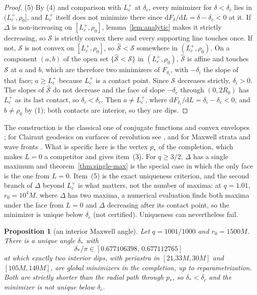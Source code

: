 \documentclass[aip,jmp,amsmath,amssymb,reprint]{revtex4-2}
\newcommand{\dd}{\mathrm{d}}
\theoremstyle{plain}
\newtheorem{proposition}{Proposition}[section]
\theoremstyle{definition}
\begin{document}
\begin{proof}
(5) By (4) and comparison with $L_c^+$ at $\delta_c$, every minimizer for $\delta<\delta_c$ lies in
$(L_c^+,\rho_0]$, and $L_c^+$ itself does not minimize there since $\dd F_\delta/\dd L=\delta-\delta_c<0$
at it. If $\Delta$ is non-increasing on $[L_c^+,\rho_0]$, lemma~\ref{lem:analytic} makes it
strictly decreasing, so $\mathcal S$ is strictly convex there and every supporting line touches
once. If not, $\mathcal S$ is not convex on $[L_c^+,\rho_0]$, so $\hat{\mathcal S}<\mathcal S$ somewhere in
$(L_c^+,\rho_0)$. On a component $(a,b)$ of the open set $\{\hat{\mathcal S}<\mathcal S\}$ in $(L_c^+,\rho_0)$,
$\hat{\mathcal S}$ is affine and touches $\mathcal S$ at $a$ and $b$, which are therefore two minimizers of
$F_{\delta_i}$, with $-\delta_i$ the slope of that face; $a\ge L_c^+$ because $L_c^+$ is a contact point. Since
$\mathcal S$ decreases strictly, $\delta_i>0$. The slopes of $\hat{\mathcal S}$ do not decrease and the face of slope
$-\delta_c$ through $(0,2R_0)$ has $L_c^+$ as its last contact, so $\delta_i<\delta_c$. Then $a\neq L_c^+$, where
$\dd F_{\delta_i}/\dd L=\delta_i-\delta_c<0$, and $b\neq\rho_0$ by (1); both contacts are interior, so they are dips.
\end{proof}

The construction is the classical one of conjugate functions and convex envelopes
\cite{Rockafellar1970}; for Clairaut geodesics on surfaces of revolution see
\cite{SinclairTanaka2007,TanakaEtAl2022}, and for Maxwell strata and wave fronts
\cite{MoiseevSachkov2010,Arnold1990}. What is specific here is the vertex $p_*$ of the
completion, which makes $L=0$ a competitor and gives item~(3). For $q\ge3/2$, $\Delta$ has a
single maximum and theorem~\ref{thm:single-max} is the special case in which the only face is
the one from $L=0$. Item~(5) is the exact uniqueness criterion, and the second branch of
$\Delta$ beyond $L_c^+$ is what matters, not the number of maxima: at $q=1.01$, $r_0=10^4M$,
where $\Delta$ has two maxima, a numerical evaluation finds both maxima under the face from
$L=0$ and $\Delta$ decreasing after its contact point, so the minimizer is unique below
$\delta_c$ (not certified). Uniqueness can nevertheless fail.

\begin{proposition}[an interior Maxwell angle]\label{prop:maxwell-angle}
Let $q=1001/1000$ and $r_0=1500M$. There is a unique angle $\delta_*$ with
\[
  \delta_*/\pi\in[0.677106398,\,0.677112765]
\]
at which exactly two interior dips, with periastra in $[21.33M,30M]$ and $[105M,140M]$, are
global minimizers in the completion, up to reparametrization. Both are strictly shorter than
the radial path through $p_*$, so $\delta_*<\delta_c$ and the minimizer is not unique below
$\delta_c$.
\end{proposition}
\end{document}

